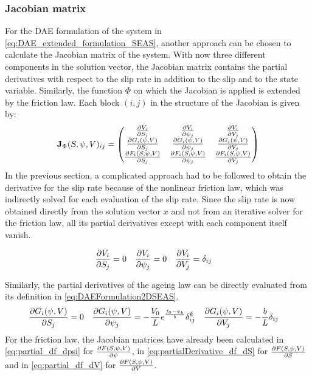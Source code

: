 \subsubsection{Jacobian matrix}
\label{sssec:Jacobian_DAE}
For the DAE formulation of the system in \autoref{eq:DAE_extended_formulation_SEAS}, another approach can be chosen to calculate the Jacobian matrix of the system. With now three different components in the solution vector, the Jacobian matrix contains the partial derivatives with respect to the slip rate in addition to the slip and to the state variable. Similarly, the function $\Phi$ on which the Jacobian is applied is extended by the friction law. Each block $(i,j)$ in the structure of the Jacobian is given by:
\begin{equation}
\label{eq:Jacobian_DAE_formulation}
\mathbf{J}_\Phi(S,\psi,V)_{ij} = \begin{pmatrix}
\pdv{V_i}{S_j} & \pdv{V_i}{\psi_j} & \pdv{V_i}{V_j} \\
\pdv{G_i(\psi,V)}{S_j} & \pdv{G_i(\psi,V)}{\psi_j} & \pdv{G_i(\psi,V)}{V_j} \\
\pdv{F_i(S,\psi,V)}{S_j} & \pdv{F_i(S,\psi,V)}{\psi_j} & \pdv{F_i(S,\psi,V)}{V_j}
\end{pmatrix}
\end{equation}
In the previous section, a complicated approach had to be followed to obtain the derivative for the slip rate because of the nonlinear friction law, which was indirectly solved for each evaluation of the slip rate. Since the slip rate is now obtained directly from the solution vector $x$ and not from an iterative solver for the friction law, all its partial derivatives except with each component itself vanish. 

\begin{align}	
\pdv{V_i}{S_j} &= 0 & \pdv{V_i}{\psi_j} &= 0 & \pdv{V_i}{V_j} &= \delta_{ij}
\end{align}

Similarly, the partial derivatives of the ageing law can be directly evaluated from its definition in \autoref{eq:DAEFormulation2DSEAS}.
\begin{align}
\pdv{G_i(\psi,V)}{S_j} &=  0 &
\pdv{G_i(\psi,V)}{\psi_j} &= -\frac{V_0}{L}e^{\frac{f_0-\psi_k}{b}}\delta_{ij}^k &	
\pdv{G_i(\psi,V)}{V_j} &= -\frac{b}{L} \delta_{ij}
\end{align}
For the friction law, the Jacobian matrices have already been calculated in \autoref{eq:partial_df_dpsi} for $\pdv{F(S,\psi,V)}{\psi}$, in \autoref{eq:partialDerivative_df_dS} for $\pdv{F(S,\psi,V)}{S}$ and in \autoref{eq:partial_df_dV} for $\pdv{F(S,\psi,V)}{V}$.

